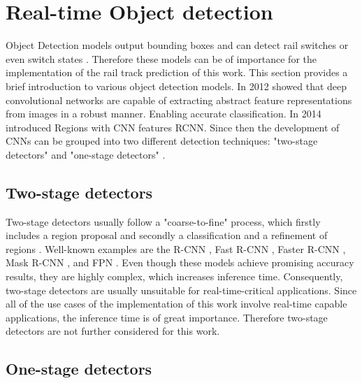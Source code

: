 \section{Real-time Object detection}
\label{sec:ObjectDetection}

Object Detection models output bounding boxes and can detect rail switches or even switch states \cite{railsem19dataset}.
Therefore these models can be of importance for the implementation of the rail track prediction of this work.
This section provides a brief introduction to various object detection models.
In 2012 \cite{AlexNet2012} showed that deep convolutional networks are capable of extracting abstract feature representations from images in a robust manner.
Enabling accurate classification.
In 2014 \cite{RCNN2014} introduced Regions with CNN features \ac{RCNN}.
Since then the development of \ac{CNN}s can be grouped into two different detection techniques: "two-stage detectors" and "one-stage detectors" \cite{20yearsSurvey, surveyObjectDetection, surveyObjectDetection2019}.

\vspace{0.5cm}

\subsection{Two-stage detectors}

Two-stage detectors usually follow a "coarse-to-fine" process, which firstly includes a region proposal and secondly a classification and a refinement of regions \cite{20yearsSurvey, surveyObjectDetection, surveyObjectDetection2019, twostageObjectDetection}.
Well-known examples are the R-CNN \cite{RCNN2014}, Fast R-CNN \cite{FastRCNN2015}, Faster R-CNN \cite{FasterRCNN2017}, Mask R-CNN \cite{MaskRCNN2017}, and \ac{FPN} \cite{FPN2017_two_stage-detector}.
Even though these models achieve promising accuracy results, they are highly complex, which increases inference time.
Consequently, two-stage detectors are usually unsuitable for real-time-critical applications.
Since all of the use cases of the implementation of this work involve real-time capable applications, the inference time is of great importance.
Therefore two-stage detectors are not further considered for this work.

\vspace{0.5cm}

\subsection{One-stage detectors}

